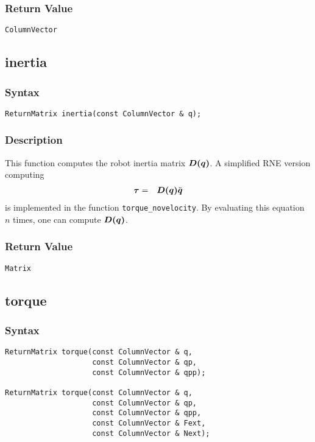 \documentclass[dvips,11pt,fleqn]{report}
\newcommand{\mbold}[1]{\mbox{\boldmath $ #1 $}}
\begin{document}

\subsubsection*{Return Value}

{\tt ColumnVector}

\newpage

\subsection*{inertia}
\subsubsection*{Syntax}
\begin{verbatim}
ReturnMatrix inertia(const ColumnVector & q);
\end{verbatim}
\subsubsection*{Description}
This function computes the robot inertia matrix $\mbold{D(q)}$. A simplified RNE version computing 
\begin{eqnarray}
\mbold{\tau} & = & \mbold{D(q)} \ddot{\mbold{q}}
\end{eqnarray}
is implemented in the function {\tt torque\_novelocity}. By evaluating this equation $n$ times, 
one can compute $\mbold{D(q)}$.


\subsubsection*{Return Value}

{\tt Matrix}

\newpage

\subsection*{torque}
\subsubsection*{Syntax}
\begin{verbatim}
ReturnMatrix torque(const ColumnVector & q, 
                    const ColumnVector & qp,
                    const ColumnVector & qpp);

ReturnMatrix torque(const ColumnVector & q,
                    const ColumnVector & qp,
                    const ColumnVector & qpp,
                    const ColumnVector & Fext,
                    const ColumnVector & Next);
\end{verbatim}
\end{document}
